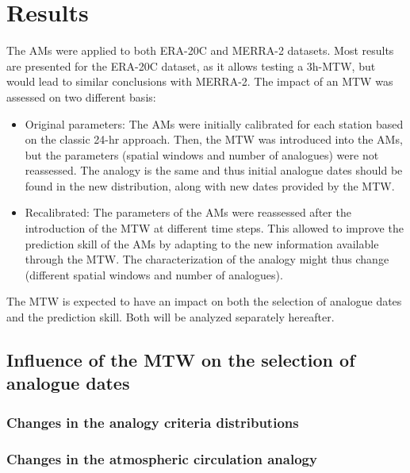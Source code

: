 \documentclass[hess, manuscript]{copernicus}
\begin{document}
	\section{Results}
	\label{sec:results}
	
	The AMs were applied to both ERA-20C and MERRA-2 datasets. Most results are presented for the ERA-20C dataset, as it allows testing a 3h-MTW, but would lead to similar conclusions with MERRA-2. The impact of an MTW was assessed on two different basis:
	\begin{itemize}
		\item Original parameters: The AMs were initially calibrated for each station based on the classic 24-hr approach. Then, the MTW was introduced into the AMs, but the parameters (spatial windows and number of analogues) were not reassessed. The analogy is the same and thus initial analogue dates should be found in the new distribution, along with new dates provided by the MTW.
		\item Recalibrated: The parameters of the AMs were reassessed after the introduction of the MTW at different time steps. This allowed to improve the prediction skill of the AMs by adapting to the new information available through the MTW. The characterization of the analogy might thus change (different spatial windows and number of analogues).
	\end{itemize}

	The MTW is expected to have an impact on both the selection of analogue dates and the prediction skill. Both will be analyzed separately hereafter.
	
	\subsection{Influence of the MTW on the selection of analogue dates}
	\label{sec:influence_analogue_dates}
	
	\subsubsection{Changes in the analogy criteria distributions}
	\label{sec:changes_distributions}
	
	
	
	
	
	

	
	\subsubsection{Changes in the atmospheric circulation analogy}
	\label{sec:perf_2Z}
	
\end{document}
